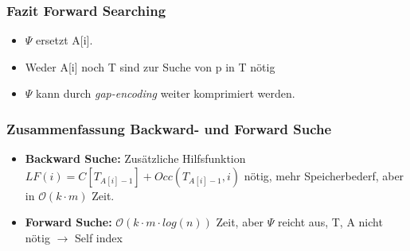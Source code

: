 \documentclass{beamer}
\begin{document}
\begin{frame}
\frametitle{Fazit Forward Searching}
\begin{itemize}
\item $\Psi$ ersetzt A[i].
\item Weder A[i] noch T sind zur Suche von p in T nötig
\item $\Psi$ kann durch \textit{gap-encoding} weiter komprimiert werden.
\end{itemize}
\end{frame}

\begin{frame}
\frametitle{Zusammenfassung Backward- und Forward Suche}
\begin{itemize}
\item \textbf{Backward Suche:} Zusätzliche Hilfsfunktion $LF(i) = C[T_{A[i]-1}] + Occ(T_{A[i]-1},i)$ nötig, mehr Speicherbederf, aber in $\mathcal{O}(k \cdot m)$ Zeit.
\item \textbf{Forward Suche:} $\mathcal{O}(k \cdot m \cdot log(n))$ Zeit, aber $\Psi$ reicht aus, T, A nicht nötig $\rightarrow$ Self index
\end{itemize}
\end{frame}
\end{document}

